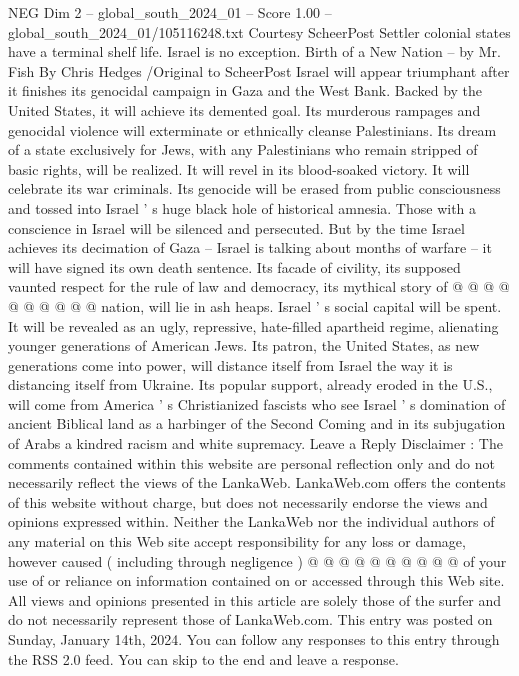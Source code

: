 \begin{textsample}{NEG Dim 2 – global\_south\_2024\_01 – Score 1.00 – global\_south\_2024\_01/105116248.txt}  \label{ex:f2_neg_326}
Courtesy ScheerPost Settler colonial states have a terminal shelf life.
Israel is no exception.
Birth of a New Nation -- by Mr.
Fish By Chris Hedges /Original to ScheerPost Israel will appear triumphant after it finishes its genocidal campaign in Gaza and the West Bank.
Backed by the United States, it will achieve its demented goal.
Its murderous rampages and genocidal violence will exterminate or ethnically cleanse Palestinians.
Its dream of a state exclusively for Jews, with any Palestinians who remain stripped of basic rights, will be realized.
It will revel in its blood-soaked victory.
It will celebrate its war criminals.
Its genocide will be erased from public consciousness and tossed into Israel ' s huge black hole of historical amnesia.
Those with a conscience in Israel will be silenced and persecuted.
But by the time Israel achieves its decimation of Gaza -- Israel is talking about months of warfare -- it will have signed its own death sentence.
Its facade of civility, its supposed vaunted respect for the rule of law and democracy, its mythical story of @ @ @ @ @ @ @ @ @ @ nation, will lie in ash heaps.
Israel ' s social capital will be spent.
It will be revealed as an ugly, repressive, hate-filled apartheid regime, alienating younger generations of American Jews.
Its patron, the United States, as new generations come into power, will distance itself from Israel the way it is distancing itself from Ukraine.
Its popular support, already eroded in the U.S., will come from America ' s Christianized fascists who see Israel ' s domination of ancient Biblical land as a harbinger of the Second Coming and in its subjugation of Arabs a kindred racism and white supremacy.
Leave a Reply Disclaimer : The comments contained within this website are personal reflection only and do not necessarily reflect the views of the LankaWeb.
LankaWeb.com offers the contents of this website without charge, but does not necessarily endorse the views and opinions expressed within.
Neither the LankaWeb nor the individual authors of any material on this Web site accept responsibility for any loss or damage, however caused ( including through negligence ) @ @ @ @ @ @ @ @ @ @ of your use of or reliance on information contained on or accessed through this Web site.
All views and opinions presented in this article are solely those of the surfer and do not necessarily represent those of LankaWeb.com.
This entry was posted on Sunday, January 14th, 2024.
You can follow any responses to this entry through the RSS 2.0 feed.
You can skip to the end and leave a response.

\end{textsample}
